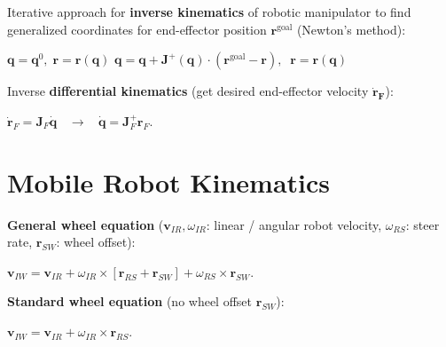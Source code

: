 \documentclass[landscape]{article}
\newcommand{\vmspace}{\vspace{-7pt}}
\newcommand{\vamspace}{\vspace{-3pt}}
\newcommand{\vpspace}{\vspace{5pt}}
\newcommand{\vtspace}{\vspace{-10pt}}
\begin{document}
\begin{multicols}{3}
\vpspace

\begin{minipage}{\columnwidth}
  Iterative approach for \textbf{inverse kinematics} of robotic manipulator to
  find generalized coordinates for end-effector position $\mathbf r^\text{goal}$
  (Newton's method):

  \vamspace

  \begin{algorithm}[H]
    \DontPrintSemicolon
    $\mathbf q = \mathbf q^0,\;\mathbf r = \mathbf r(\mathbf q)$\;
    {
    $\mathbf q = \mathbf q + \mathbf J^+(\mathbf q) \cdot (\mathbf r^\text{goal}
    - \mathbf r),\;\;
    \mathbf r = \mathbf r ( \mathbf q )$\;
    }
  \end{algorithm}
\end{minipage}

\vpspace

\begin{minipage}{\columnwidth}
  Inverse \textbf{differential kinematics} (get desired end-effector velocity
  $\mathbf{\dot{r}_F}$):
  \vmspace
  \begin{center}
    $\mathbf{\dot r}_F = \mathbf J_F \mathbf{\dot q}$
    $\;\;\rightarrow\;\;$
    $\mathbf{\dot q} = \mathbf J_F^+ \mathbf r_F.$
  \end{center}
\end{minipage}


\vtspace

\section{Mobile Robot Kinematics}

\vmspace

\begin{minipage}{\columnwidth}
  \textbf{General wheel equation} ($\mathbf v_{IR}, \omega_{IR}$: linear /
  angular robot velocity, $\omega_{RS}$: steer rate, $\mathbf r_{SW}$: wheel
  offset):
  \vmspace
  \begin{center}
    $\mathbf v_{IW} = \mathbf v_{IR} + \omega_{IR} \times [\mathbf r_{RS} +
    \mathbf r_{SW}] +
    \omega_{RS} \times \mathbf r_{SW}.$
  \end{center}
\end{minipage}

\vpspace

\begin{minipage}{\columnwidth}
  \textbf{Standard wheel equation} (no wheel offset $\mathbf r_{SW}$):
  \vmspace
  \begin{center}
    $\mathbf v_{IW} = \mathbf v_{IR} + \omega_{IR} \times \mathbf r_{RS}.$
  \end{center}
\end{minipage}


\end{multicols}
\end{document}
